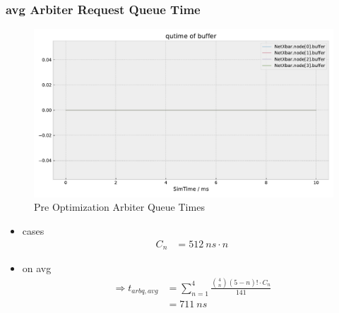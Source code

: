 \documentclass[]{scrartcl}
\begin{document}
    \subsubsection{avg Arbiter Request Queue Time}
        \begin{figure}[H]
            \centering
            \includegraphics[width=\columnwidth, page=7]{../../python/results/preopt-General-0}
            \caption{Pre Optimization Arbiter Queue Times}%
            \label{fig:preopt-arbiter-qtime}
        \end{figure}
        \begin{itemize}
            \item cases
                \begin{align}
                    C_n &= \SI{512}{ns} \cdot n
                \end{align}
            \item on avg
                \begin{align}
                    \Rightarrow t_{arbq,avg} &= \sum_{n=1}^4 \frac{\binom{4}{n}\left( 5-n \right)! \cdot C_n }{141}\\
                                             &= \SI{711}{ns}
                \end{align}
        \end{itemize}
\end{document}
